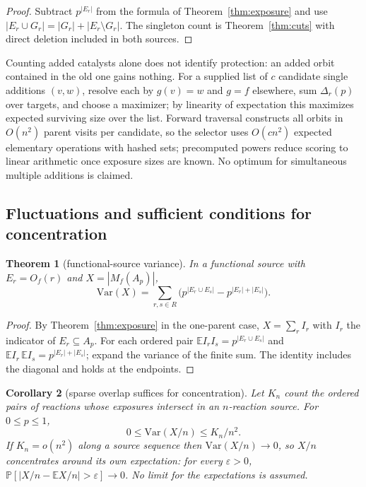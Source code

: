 \documentclass[11pt,a4paper]{article}
\theoremstyle{plain}
\newtheorem{theorem}{Theorem}[section]
\newtheorem{corollary}[theorem]{Corollary}
\theoremstyle{definition}
\theoremstyle{remark}
\newcommand{\E}{\mathbb{E}}
\renewcommand{\Pr}{\mathbb{P}}
\newcommand{\Var}{\mathrm{Var}}
\begin{document}
\begin{proof}
Subtract $p^{|E_r|}$ from the formula of Theorem~\ref{thm:exposure} and use $|E_r\cup G_r|=|G_r|+|E_r\setminus G_r|$. The singleton count is Theorem~\ref{thm:cuts} with direct deletion included in both sources.
\end{proof}

Counting added catalysts alone does not identify protection: an added orbit contained in the old one gains nothing. For a supplied list of $c$ candidate single additions $(v,w)$, resolve each by $g(v)=w$ and $g=f$ elsewhere, sum $\Delta_r(p)$ over targets, and choose a maximizer; by linearity of expectation this maximizes expected surviving size over the list. Forward traversal constructs all orbits in $O(n^{2})$ parent visits per candidate, so the selector uses $O(cn^{2})$ expected elementary operations with hashed sets; precomputed powers reduce scoring to linear arithmetic once exposure sizes are known. No optimum for simultaneous multiple additions is claimed.

\subsection{Fluctuations and sufficient conditions for concentration}

\begin{theorem}[functional-source variance]\label{thm:variance}
In a functional source with $E_r=O_f(r)$ and $X=|M_f(A_p)|$,
\[
\Var(X)=\sum_{r,s\in R}\Big(p^{|E_r\cup E_s|}-p^{|E_r|+|E_s|}\Big).
\]
\end{theorem}

\begin{proof}
By Theorem~\ref{thm:exposure} in the one-parent case, $X=\sum_r I_r$ with $I_r$ the indicator of $E_r\subseteq A_p$. For each ordered pair $\E I_rI_s=p^{|E_r\cup E_s|}$ and $\E I_r\,\E I_s=p^{|E_r|+|E_s|}$; expand the variance of the finite sum. The identity includes the diagonal and holds at the endpoints.
\end{proof}

\begin{corollary}[sparse overlap suffices for concentration]\label{cor:concentration}
Let $K_n$ count the ordered pairs of reactions whose exposures intersect in an $n$-reaction source. For $0\le p\le1$,
\[
0\le\Var(X/n)\le K_n/n^{2}.
\]
If $K_n=o(n^{2})$ along a source sequence then $\Var(X/n)\to0$, so $X/n$ concentrates around its own expectation: for every $\varepsilon>0$, $\Pr[|X/n-\E X/n|>\varepsilon]\to0$. No limit for the expectations is assumed.
\end{corollary}
\end{document}
